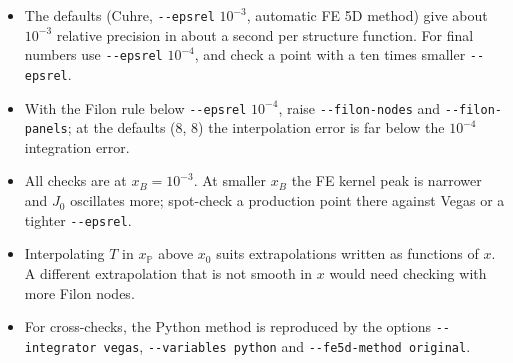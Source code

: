 \documentclass[11pt,a4paper]{article}
\newcommand{\xP}{x_{\mathbb{P}}}
\newcommand{\opt}[1]{\texttt{-{}-#1}}
\begin{document}
\begin{itemize}
  \item The defaults (Cuhre, \opt{epsrel} $10^{-3}$, automatic FE 5D method)
    give about $10^{-3}$ relative precision in about a second per structure
    function. For final numbers use \opt{epsrel} $10^{-4}$, and check a point
    with a ten times smaller \opt{epsrel}.
  \item With the Filon rule below \opt{epsrel} $10^{-4}$, raise
    \opt{filon-nodes} and \opt{filon-panels}; at the defaults (8, 8) the
    interpolation error is far below the $10^{-4}$ integration error.
  \item All checks are at $x_B = 10^{-3}$. At smaller $x_B$ the FE kernel peak
    is narrower and $J_0$ oscillates more; spot-check a production point there
    against Vegas or a tighter \opt{epsrel}.
  \item Interpolating $T$ in $\xP$ above $x_0$ suits extrapolations written as
    functions of $x$. A different extrapolation that is not smooth in $x$ would
    need checking with more Filon nodes.
  \item For cross-checks, the Python method is reproduced by the options
    \opt{integrator vegas}, \opt{variables python} and
    \opt{fe5d-method original}.
\end{itemize}
\end{document}
